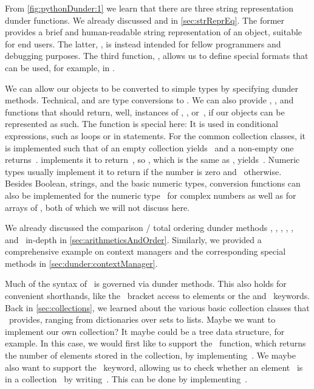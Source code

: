 From \cref{fig:pythonDunder:1} we learn that there are three string representation dunder functions.
We already discussed  and  in \cref{sec:strReprEq}.
The former provides a brief and human-readable string representation of an object, suitable for end users.
The latter, , is instead intended for fellow programmers and debugging purposes.
The third function, , allows us to define special formats that can be used, for example, in .

We can allow our objects to be converted to simple types by specifying dunder methods.
Technical,  and  are type conversions to .
We can also provide , , and  functions that should return, well, instances of , , or~, if our objects can be represented as such.
The  function is special here:
It is used in conditional expressions, such as  loops or in  statements.
For the common collection classes, it is implemented such that  of an empty collection yields~ and a non-empty one returns~.
 implements it to return~, so , which is the same as , yields~.
Numeric types usually implement it to return  if the number is zero and~ otherwise.
Besides Boolean, strings, and the basic numeric types, conversion functions can also be implemented for the numeric type~ for complex numbers as well as for arrays of , both of which we will not discuss here.

We already discussed the comparison / total ordering dunder methods , , , , , and~ in-depth in \cref{sec:arithmeticsAndOrder}.
Similarly, we provided a comprehensive example on context managers and the corresponding special methods in \cref{sec:dunder:contextManager}.

Much of the syntax of \python\ is governed via dunder methods.
This also holds for convenient shorthands, like the \pythonil{[...]}\pythonIdx{[\idxdots]}~bracket access to elements or the  and ~keywords.
Back in \cref{sec:collections}, we learned about the various basic collection classes that \python\ provides, ranging from dictionaries over sets to lists.
Maybe we want to implement our own collection?
It maybe could be a tree data structure, for example.
In this case, we would first like to support the ~function, which returns the number of elements stored in the collection, by implementing~.
We maybe also want to support the ~keyword, allowing us to check whether an element~ is in a collection~ by writing~.
This can be done by implementing~.

